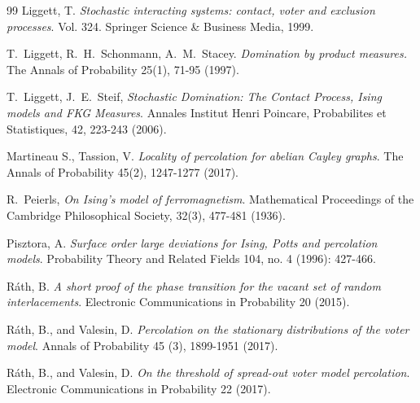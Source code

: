 \documentclass[a4paper,12pt]{article}
\begin{document}
{\begin{thebibliography}{99}
 Liggett, T. \textit{Stochastic interacting systems: contact, voter and exclusion processes}. Vol. 324. Springer Science \& Business Media, 1999.

T.\ Liggett, R.\ H.\ Schonmann, A.\ M.\ Stacey. \textit{Domination by product measures.} The Annals of Probability 25(1), 71-95 (1997).



T.\ Liggett, J.\ E.\ Steif,
\textit{Stochastic Domination: The Contact Process, Ising models and FKG Measures}.
Annales Institut Henri Poincare, Probabilites et Statistiques,
 42,  223-243 (2006).

 Martineau S., Tassion, V. \textit{Locality of percolation for abelian Cayley graphs}. The Annals of Probability 45(2), 1247-1277 (2017).


 R.\ Peierls, \textit{On Ising's model of ferromagnetism}.
Mathematical Proceedings of the Cambridge Philosophical Society,
  32(3), 477-481  (1936).

 Pisztora, A. \textit{Surface order large deviations for Ising, Potts and percolation models}. Probability Theory and Related Fields 104, no. 4 (1996): 427-466.



 R\'ath, B. \textit{A short proof of the phase transition for the vacant set of random interlacements}. Electronic Communications in Probability 20 (2015).

 R\'ath, B., and Valesin, D. \textit{Percolation on the stationary distributions of the voter model}. Annals of Probability  45 (3), 1899-1951 (2017).

  R\'ath, B., and Valesin, D. \textit{On the threshold of spread-out voter model percolation}. Electronic Communications in Probability 22 (2017).





\end{thebibliography}}
\end{document}
